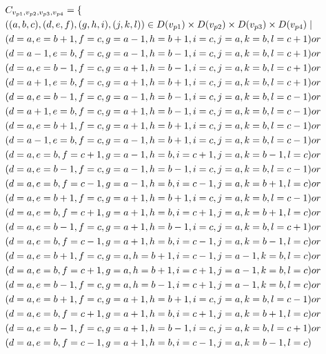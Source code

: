 \begin{align*}
&C_{v_{p1},v_{p2},v_{p3},v_{p4}}=\{\\
&((a,b,c),(d,e,f),(g,h,i),(j,k,l))\in D(v_{p1}) \times D(v_{p2})\times D(v_{p3})\times D(v_{p4})\mid\\
&(d=a ,e=b+1,f=c , g=a-1,h=b+1,i=c ,j=a ,k=b ,l=c+1)or\\
&(d=a-1,e=b ,f=c , g=a-1,h=b-1,i=c ,j=a ,k=b ,l=c+1)or\\
&(d=a ,e=b-1,f=c , g=a+1,h=b-1,i=c ,j=a ,k=b ,l=c+1)or\\
&(d=a+1,e=b ,f=c , g=a+1,h=b+1,i=c ,j=a ,k=b ,l=c+1)or\\
&(d=a ,e=b-1,f=c , g=a-1,h=b-1,i=c ,j=a ,k=b ,l=c-1)or\\
&(d=a+1,e=b ,f=c , g=a+1,h=b-1,i=c ,j=a ,k=b ,l=c-1)or\\
&(d=a ,e=b+1,f=c , g=a+1,h=b+1,i=c ,j=a ,k=b ,l=c-1)or\\
&(d=a-1,e=b ,f=c , g=a-1,h=b+1,i=c ,j=a ,k=b ,l=c-1)or\\
&(d=a ,e=b ,f=c+1, g=a-1,h=b ,i=c+1,j=a ,k=b-1,l=c )or\\
&(d=a ,e=b-1,f=c , g=a-1,h=b-1,i=c ,j=a ,k=b ,l=c-1)or\\
&(d=a ,e=b ,f=c-1, g=a-1,h=b ,i=c-1,j=a ,k=b+1,l=c )or\\
&(d=a ,e=b+1,f=c , g=a+1,h=b+1,i=c ,j=a ,k=b ,l=c-1)or\\
&(d=a ,e=b ,f=c+1, g=a+1,h=b ,i=c+1,j=a ,k=b+1,l=c )or\\
&(d=a ,e=b-1,f=c , g=a+1,h=b-1,i=c ,j=a ,k=b ,l=c+1)or\\
&(d=a ,e=b ,f=c-1, g=a+1,h=b ,i=c-1,j=a ,k=b-1,l=c )or\\
&(d=a ,e=b+1,f=c , g=a ,h=b+1,i=c-1,j=a-1,k=b ,l=c )or\\
&(d=a ,e=b ,f=c+1, g=a ,h=b+1,i=c+1,j=a-1,k=b ,l=c )or\\
&(d=a ,e=b-1,f=c , g=a ,h=b-1,i=c+1,j=a-1,k=b ,l=c )or\\
&(d=a ,e=b+1,f=c , g=a+1,h=b+1,i=c ,j=a ,k=b ,l=c-1)or\\
&(d=a ,e=b ,f=c+1, g=a+1,h=b ,i=c+1,j=a ,k=b+1,l=c )or\\
&(d=a ,e=b-1,f=c , g=a+1,h=b-1,i=c ,j=a ,k=b ,l=c+1)or\\
&(d=a ,e=b ,f=c-1, g=a+1,h=b ,i=c-1,j=a ,k=b-1,l=c )
\end{align*}
